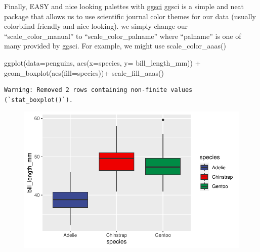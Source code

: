 \documentclass[
  letterpaper,
  DIV=11,
  numbers=noendperiod]{scrartcl}
\newenvironment{Shaded}{\begin{snugshade}}{\end{snugshade}}
\newcommand{\AttributeTok}[1]{\textcolor[rgb]{0.40,0.45,0.13}{#1}}
\newcommand{\FunctionTok}[1]{\textcolor[rgb]{0.28,0.35,0.67}{#1}}
\newcommand{\NormalTok}[1]{\textcolor[rgb]{0.00,0.23,0.31}{#1}}
\newcommand{\SpecialCharTok}[1]{\textcolor[rgb]{0.37,0.37,0.37}{#1}}
\begin{document}
Finally, EASY and nice looking palettes with
\href{https://cran.r-project.org/web/packages/ggsci/vignettes/ggsci.html}{ggsci}
ggsci is a simple and neat package that allows us to use scientific
journal color themes for our data (usually colorblind friendly and nice
looking). we simply change our ``scale\_color\_manual'' to
``scale\_color\_palname'' where ``palname'' is one of many provided by
ggsci. For example, we might use scale\_color\_aaas()

\begin{Shaded}
\begin{Highlighting}[]
\FunctionTok{ggplot}\NormalTok{(}\AttributeTok{data=}\NormalTok{penguins, }\FunctionTok{aes}\NormalTok{(}\AttributeTok{x=}\NormalTok{species, }\AttributeTok{y=}\NormalTok{ bill\_length\_mm)) }\SpecialCharTok{+}
  \FunctionTok{geom\_boxplot}\NormalTok{(}\FunctionTok{aes}\NormalTok{(}\AttributeTok{fill=}\NormalTok{species))}\SpecialCharTok{+}
  \FunctionTok{scale\_fill\_aaas}\NormalTok{()}
\end{Highlighting}
\end{Shaded}

\begin{verbatim}
Warning: Removed 2 rows containing non-finite values (`stat_boxplot()`).
\end{verbatim}

\begin{figure}[H]

{\centering \includegraphics{colors_files/figure-pdf/unnamed-chunk-6-1.pdf}

}

\end{figure}
\end{document}
